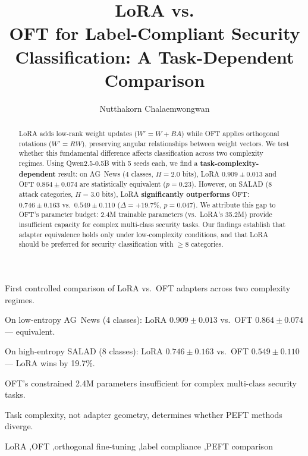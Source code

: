 \documentclass[review,3p]{elsarticle}
\begin{document}
\begin{frontmatter}

\title{LoRA vs.\\ OFT for Label-Compliant Security Classification: A Task-Dependent Comparison}
\author[kmitl]{Nutthakorn Chalaemwongwan}
\address[kmitl]{Department of Computer Engineering, KOSEN-KMITL, King Mongkut's Institute of Technology Ladkrabang, Bangkok, Thailand}


\begin{highlights}
\item First controlled comparison of LoRA vs.\ OFT adapters across two complexity regimes.
\item On low-entropy AG~News (4 classes): LoRA $0.909 \pm 0.013$ vs.\ OFT $0.864 \pm 0.074$ --- equivalent.
\item On high-entropy SALAD (8 classes): LoRA $0.746 \pm 0.163$ vs.\ OFT $0.549 \pm 0.110$ --- LoRA wins by 19.7\%.
\item OFT's constrained 2.4M parameters insufficient for complex multi-class security tasks.
\item Task complexity, not adapter geometry, determines whether PEFT methods diverge.
\end{highlights}

\begin{abstract}
LoRA adds low-rank weight updates ($W'=W+BA$) while OFT applies orthogonal rotations ($W'=RW$), preserving angular relationships between weight vectors. We test whether this fundamental difference affects classification across two complexity regimes. Using Qwen2.5-0.5B with 5 seeds each, we find a \textbf{task-complexity-dependent} result: on AG~News (4 classes, $H=2.0$ bits), LoRA $0.909 \pm 0.013$ and OFT $0.864 \pm 0.074$ are statistically equivalent ($p=0.23$). However, on SALAD (8 attack categories, $H=3.0$ bits), LoRA \textbf{significantly outperforms} OFT: $0.746 \pm 0.163$ vs.\ $0.549 \pm 0.110$ ($\Delta = +19.7\%$, $p = 0.047$). We attribute this gap to OFT's parameter budget: 2.4M trainable parameters (vs.\ LoRA's 35.2M) provide insufficient capacity for complex multi-class security tasks. Our findings establish that adapter equivalence holds only under low-complexity conditions, and that LoRA should be preferred for security classification with $\geq 8$ categories.
\end{abstract}
\begin{keyword}
LoRA \sep OFT \sep orthogonal fine-tuning \sep label compliance \sep PEFT comparison
\end{keyword}

\end{frontmatter}
\end{document}
